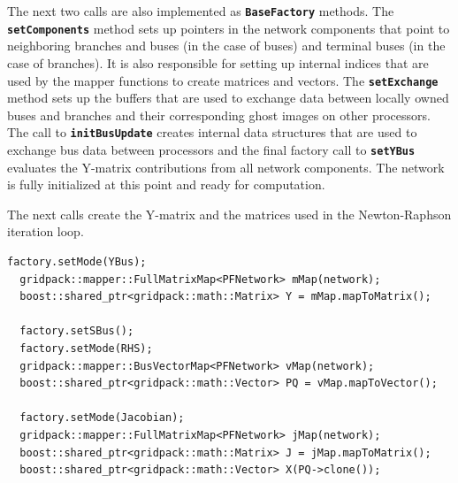 \documentclass[12pt]{report} %
\begin{document}
The next two calls are also implemented as \texttt{\textbf{BaseFactory}} methods. The \texttt{\textbf{setComponents}} method sets up pointers in the network components that point to neighboring branches and buses (in the case of buses) and terminal buses (in the case of branches). It is also responsible for setting up internal indices that are used by the mapper functions to create matrices and vectors. The \texttt{\textbf{setExchange}} method sets up the buffers that are used to exchange data between locally owned buses and branches and their corresponding ghost images on other processors. The call to \texttt{\textbf{initBusUpdate}} creates internal data structures that are used to exchange bus data between processors and the final factory call to \texttt{\textbf{setYBus}} evaluates the Y-matrix contributions from all network components. The network is fully initialized at this point and ready for computation.

The next calls create the Y-matrix and the matrices used in the Newton-Raphson iteration loop.

{
\color{red}
\begin{Verbatim}[fontseries=b]
  factory.setMode(YBus);
  gridpack::mapper::FullMatrixMap<PFNetwork> mMap(network);
  boost::shared_ptr<gridpack::math::Matrix> Y = mMap.mapToMatrix();

  factory.setSBus();
  factory.setMode(RHS);
  gridpack::mapper::BusVectorMap<PFNetwork> vMap(network);
  boost::shared_ptr<gridpack::math::Vector> PQ = vMap.mapToVector();

  factory.setMode(Jacobian);
  gridpack::mapper::FullMatrixMap<PFNetwork> jMap(network);
  boost::shared_ptr<gridpack::math::Matrix> J = jMap.mapToMatrix();
  boost::shared_ptr<gridpack::math::Vector> X(PQ->clone());
\end{Verbatim}
}
\end{document}
